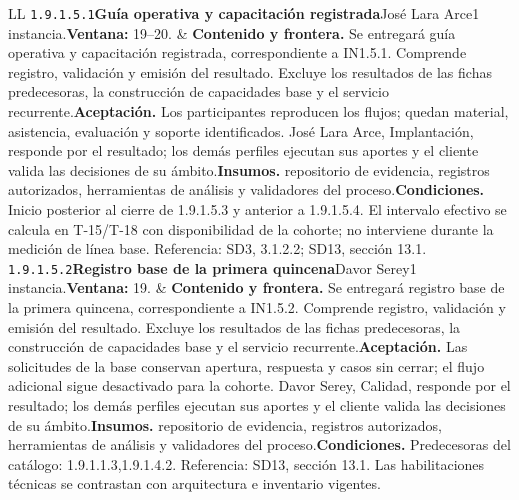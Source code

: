 \begin{longtable}{L{\tabcolsep\relax}L{\tabcolsep\relax}}
\texttt{1.\allowbreak{}9.\allowbreak{}1.\allowbreak{}5.\allowbreak{}1}\newline{}\textbf{Guía operativa y capacitación registrada}\newline{}José Lara Arce\newline{}1 instancia.\newline{}\textbf{Ventana:} 19--20. & \textbf{Contenido y frontera.} Se entregará guía operativa y capacitación registrada, correspondiente a IN1.5.1. Comprende registro, validación y emisión del resultado. Excluye los resultados de las fichas predecesoras, la construcción de capacidades base y el servicio recurrente.\newline{}\textbf{Aceptación.} Los participantes reproducen los flujos; quedan material, asistencia, evaluación y soporte identificados. José Lara Arce, Implantación, responde por el resultado; los demás perfiles ejecutan sus aportes y el cliente valida las decisiones de su ámbito.\newline{}\textbf{Insumos.} repositorio de evidencia, registros autorizados, herramientas de análisis y validadores del proceso.\newline{}\textbf{Condiciones.} Inicio posterior al cierre de 1.9.1.5.3 y anterior a 1.9.1.5.4. El intervalo efectivo se calcula en T-15/T-18 con disponibilidad de la cohorte; no interviene durante la medición de línea base. Referencia: SD3, 3.1.2.2; SD13, sección 13.1.\\\hline
\texttt{1.\allowbreak{}9.\allowbreak{}1.\allowbreak{}5.\allowbreak{}2}\newline{}\textbf{Registro base de la primera quincena}\newline{}Davor Serey\newline{}1 instancia.\newline{}\textbf{Ventana:} 19. & \textbf{Contenido y frontera.} Se entregará registro base de la primera quincena, correspondiente a IN1.5.2. Comprende registro, validación y emisión del resultado. Excluye los resultados de las fichas predecesoras, la construcción de capacidades base y el servicio recurrente.\newline{}\textbf{Aceptación.} Las solicitudes de la base conservan apertura, respuesta y casos sin cerrar; el flujo adicional sigue desactivado para la cohorte. Davor Serey, Calidad, responde por el resultado; los demás perfiles ejecutan sus aportes y el cliente valida las decisiones de su ámbito.\newline{}\textbf{Insumos.} repositorio de evidencia, registros autorizados, herramientas de análisis y validadores del proceso.\newline{}\textbf{Condiciones.} Predecesoras del catálogo: 1.9.1.1.3,1.9.1.4.2. Referencia: SD13, sección 13.1. Las habilitaciones técnicas se contrastan con arquitectura e inventario vigentes.\\\hline

\end{longtable}

